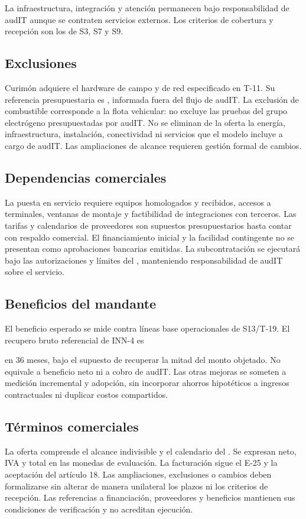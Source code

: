 La infraestructura, integración y atención permanecen bajo responsabilidad de audIT aunque se
contraten servicios externos. Los criterios de cobertura y recepción son los de S3, S7 y S9.

\subsection{Exclusiones}\label{sec:eco-exclusiones}

Curimón adquiere el hardware de campo y de red especificado en T-11. Su referencia presupuestaria
es , informada fuera del flujo de audIT. La exclusión de
combustible corresponde a la flota vehicular: no excluye las pruebas del grupo electrógeno
presupuestadas por audIT. No se eliminan de la oferta la energía, infraestructura, instalación,
conectividad ni servicios que el modelo incluye a cargo de audIT. Las ampliaciones de alcance
requieren gestión formal de cambios.

\subsection{Dependencias comerciales}\label{sec:eco-supuestos}

La puesta en servicio requiere equipos homologados y recibidos, accesos a terminales, ventanas
de montaje y factibilidad de integraciones con terceros. Las tarifas y calendarios de proveedores
son supuestos presupuestarios hasta contar con respaldo comercial. El financiamiento inicial y
la facilidad contingente no se presentan como aprobaciones bancarias emitidas. La subcontratación
se ejecutará bajo las autorizaciones y límites del , manteniendo responsabilidad
de audIT sobre el servicio.

\subsection{Beneficios del mandante}\label{sec:eco-beneficios}

El beneficio esperado se mide contra líneas base operacionales de S13/T-19. El recupero bruto
referencial de INN-4 es\par\noindent{} en 36 meses, bajo el supuesto de recuperar
la mitad del monto objetado. No equivale a beneficio neto ni a cobro de audIT. Las otras mejoras
se someten a medición incremental y adopción, sin incorporar ahorros hipotéticos a ingresos
contractuales ni duplicar costos compartidos.

\subsection{Términos comerciales}\label{sec:eco-terminos}

La oferta comprende el alcance indivisible y el calendario del . Se expresan
neto, IVA y total en las monedas de evaluación. La facturación sigue el E-25 y la aceptación
del artículo 18. Las ampliaciones, exclusiones o cambios deben formalizarse sin alterar de
manera unilateral los plazos ni los criterios de recepción. Las referencias a financiación,
proveedores y beneficios mantienen sus condiciones de verificación y no acreditan ejecución.
